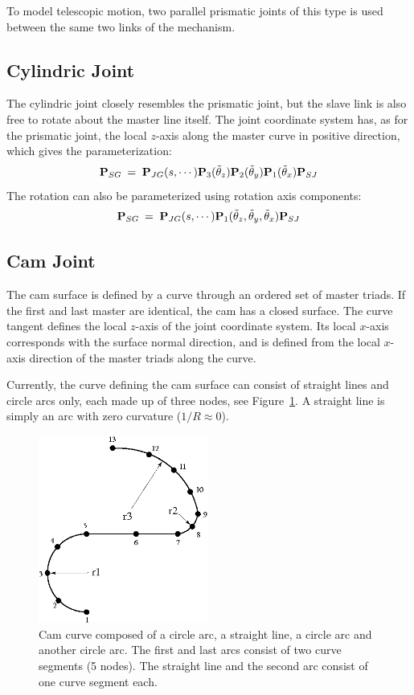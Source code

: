 To model telescopic motion, two parallel prismatic joints of this type is used
between the same two links of the mechanism.


\subsection{Cylindric Joint}

The cylindric joint closely resembles the prismatic joint, but the slave link
is also free to rotate about the master line itself.
The joint coordinate system has, as for the prismatic joint, the local $z$-axis
along the master curve in positive direction, which gives the parameterization:
%
\begin{equation}
{\bf P}_{SG} \:=\; {\bf P}_{JG}(s,\cdots)
{\bf P}_3(\tilde\theta_z)
{\bf P}_2(\tilde\theta_y)
{\bf P}_1(\tilde\theta_x)
{\bf P}_{SJ}
\label{eq:CylindricDef}
\end{equation}
%
The rotation can also be parameterized using rotation axis components:
%
\begin{equation}
{\bf P}_{SG} \:=\; {\bf P}_{JG}(s,\cdots)
{\bf P}_1(\tilde\theta_z,\tilde\theta_y,\tilde\theta_x)
{\bf P}_{SJ}
\label{eq:CylindricDef2}
\end{equation}


\subsection{Cam Joint}
\label{subs:Cam Joint}

The cam surface is defined by a curve through an ordered set of master triads.
If the first and last master are identical, the cam has a closed surface.
The curve tangent defines the local $z$-axis of the joint coordinate system.
Its local $x$-axis corresponds with the surface normal direction, and is defined
from the local $x$-axis direction of the master triads along the curve.

Currently, the curve defining the cam surface can consist of straight lines
and circle arcs only, each made up of three nodes, see Figure~\ref{fig:Cam}.
A straight line is simply an arc with zero curvature ($1/R\approx0$).

\begin{figure}[t]
\center\includegraphics[width=2.2in]{Figures/CamCurve.png}
\caption{Cam curve composed of a circle arc, a straight line, a circle arc
and another circle arc.
The first and last arcs consist of two curve segments (5 nodes).
The straight line and the second arc consist of one curve segment each.}
\label{fig:Cam}
\end{figure}

